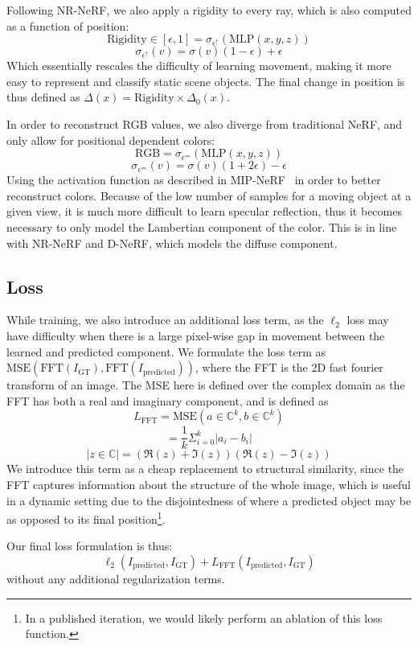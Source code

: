 Following NR-NeRF, we also apply a rigidity to every ray, which is also computed as a function of position:
\[ \text{Rigidity}\in[\epsilon, 1] =\sigma_{\epsilon^\uparrow}(\text{MLP}(x,y,z)) \]
\[ \sigma_{\epsilon^\uparrow}(v) = \sigma(v)(1-\epsilon) + \epsilon \]
Which essentially rescales the
difficulty of learning movement, making it more easy to represent and classify static scene
objects. The final change in position is thus defined as $\Delta(x) = \text{Rigidity}\times
\Delta_0(x)$.

In order to reconstruct RGB values, we also diverge from traditional NeRF, and only allow for
positional dependent colors:
\[ \text{RGB} = \sigma_{\epsilon^\Leftrightarrow}(\text{MLP}(x,y,z)) \]
\[ \sigma_{\epsilon^\Leftrightarrow}(v) = \sigma(v)(1+2\epsilon) - \epsilon \]
Using the
activation function as described in MIP-NeRF~\cite{barron2021mipnerf} in order to better reconstruct colors. Because of the low number of
samples for a moving object at a given view, it is much more difficult to learn specular
reflection, thus it becomes necessary to only model the Lambertian component of the color. This is in line with NR-NeRF and D-NeRF, which models the diffuse component.

\subsection*{Loss}
While training, we also introduce an additional loss term, as the $\ell_2$ loss may have
difficulty when there is a large pixel-wise gap in movement between the learned and predicted
component. We formulate the loss term as $\text{MSE}(\text{FFT}(I_\text{GT}),
\text{FFT}(I_\text{predicted}))$, where the FFT is the 2D fast fourier transform of an image.
The MSE here is defined over the complex domain as the FFT has both a real and imaginary
component, and is defined as \[ L_\text{FFT} =\text{MSE}(a\in\mathbb{C}^k,b\in\mathbb{C}^k) \]
\[ = \frac{1}{k}\Sigma_{i=0}^k|a_i-b_i| \]
\[ |z\in\mathbb{C}| = (\Re(z)+\Im(z))(\Re(z)-\Im(z)) \]
We introduce this term as a cheap replacement to structural similarity, since the FFT captures
information about the structure of the whole image, which is useful in a dynamic setting due to
the disjointedness of where a predicted object may be as opposed to its final position\footnote{In a published iteration, we would likely perform an ablation of this loss function.}.

Our final loss formulation is thus:
\[ \ell_2(I_\text{predicted}, I_\text{GT}) + L_\text{FFT}(I_\text{predicted}, I_\text{GT}) \]
without any additional regularization terms.

